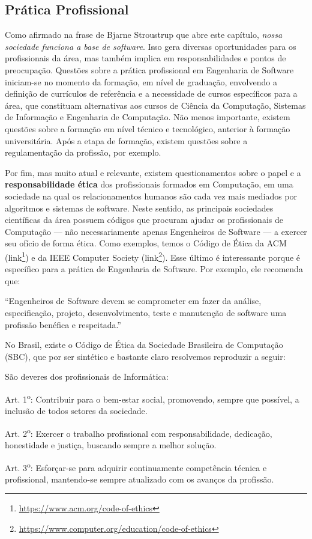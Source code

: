 \documentclass[
  11pt,
  twoside]{book}
\DeclareRobustCommand{\href}[2]{#2\footnote{\url{#1}}}
\renewenvironment{quote}{\centering \vspace{1.5ex} \begin{tcolorbox}[colback=backcolor, width=4.9in]}{\end{tcolorbox}}
\begin{document}
\hypertarget{pruxe1tica-profissional}{%
\subsection{Prática Profissional}\label{pruxe1tica-profissional}}

 Como afirmado na frase de Bjarne Stroustrup
que abre este capítulo, \emph{nossa sociedade funciona a base de
software}. Isso gera diversas oportunidades para os profissionais da
área, mas também implica em responsabilidades e pontos de preocupação.
Questões sobre a prática profissional em Engenharia de Software
iniciam-se no momento da formação, em nível de graduação, envolvendo a
definição de currículos de referência e a necessidade de cursos
específicos para a área, que constituam alternativas aos cursos de
Ciência da Computação, Sistemas de Informação e Engenharia de
Computação. Não menos importante, existem questões sobre a formação em
nível técnico e tecnológico, anterior à formação universitária. Após a
etapa de formação, existem questões sobre a regulamentação da profissão,
por exemplo.

 Por fim, mas muito atual e relevante, existem
questionamentos sobre o papel e a \textbf{responsabilidade ética} dos
profissionais formados em Computação, em uma sociedade na qual os
relacionamentos humanos são cada vez mais mediados por algoritmos e
sistemas de software. Neste sentido, as principais sociedades
científicas da área possuem códigos que procuram ajudar os profissionais
de Computação --- não necessariamente apenas Engenheiros de Software ---
a exercer seu ofício de forma ética. Como exemplos, temos o Código de
Ética da ACM (\href{https://www.acm.org/code-of-ethics}{link}) e da IEEE
Computer Society
(\href{https://www.computer.org/education/code-of-ethics}{link}). Esse
último é interessante porque é específico para a prática de Engenharia
de Software. Por exemplo, ele recomenda que:

\begin{quote}
``Engenheiros de Software devem se comprometer em fazer da análise,
especificação, projeto, desenvolvimento, teste e manutenção de software
uma profissão benéfica e respeitada.''
\end{quote}

 No Brasil, existe o Código de Ética da Sociedade
Brasileira de Computação (SBC), que por ser sintético e bastante claro
resolvemos reproduzir a seguir:

\begin{quote}
São deveres dos profissionais de Informática:

Art. 1\textsuperscript{o}: Contribuir para o bem-estar social,
promovendo, sempre que possível, a inclusão de todos setores da
sociedade.

Art. 2\textsuperscript{o}: Exercer o trabalho profissional com
responsabilidade, dedicação, honestidade e justiça, buscando sempre a
melhor solução.

Art. 3\textsuperscript{o}: Esforçar-se para adquirir continuamente
competência técnica e profissional, mantendo-se sempre atualizado com os
avanços da profissão.
\end{quote}
\end{document}
